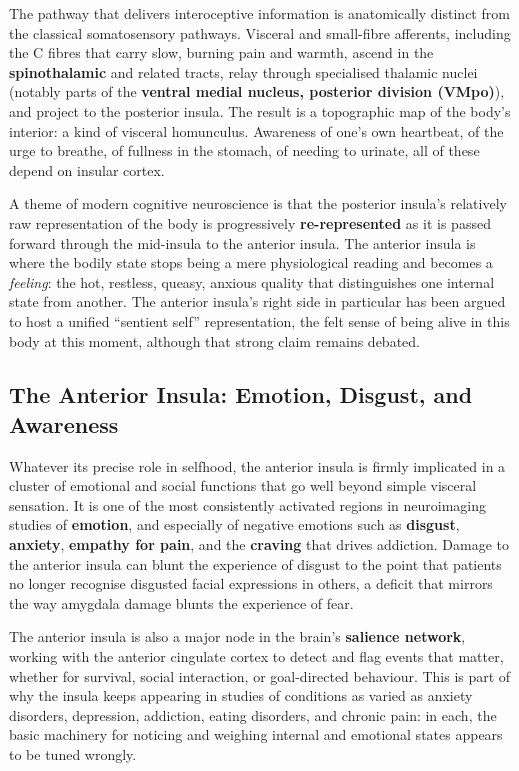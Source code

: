 \documentclass[11pt]{article}
\begin{document}
The pathway that delivers interoceptive information is anatomically distinct from the classical somatosensory pathways. Visceral and small-fibre afferents, including the C fibres that carry slow, burning pain and warmth, ascend in the \textbf{spinothalamic} and related tracts, relay through specialised thalamic nuclei (notably parts of the \textbf{ventral medial nucleus, posterior division (VMpo)}), and project to the posterior insula. The result is a topographic map of the body's interior: a kind of visceral homunculus. Awareness of one's own heartbeat, of the urge to breathe, of fullness in the stomach, of needing to urinate, all of these depend on insular cortex.

A theme of modern cognitive neuroscience is that the posterior insula's relatively raw representation of the body is progressively \textbf{re-represented} as it is passed forward through the mid-insula to the anterior insula. The anterior insula is where the bodily state stops being a mere physiological reading and becomes a \textit{feeling}: the hot, restless, queasy, anxious quality that distinguishes one internal state from another. The anterior insula's right side in particular has been argued to host a unified ``sentient self'' representation, the felt sense of being alive in this body at this moment, although that strong claim remains debated.

\subsection{The Anterior Insula: Emotion, Disgust, and Awareness}

Whatever its precise role in selfhood, the anterior insula is firmly implicated in a cluster of emotional and social functions that go well beyond simple visceral sensation. It is one of the most consistently activated regions in neuroimaging studies of \textbf{emotion}, and especially of negative emotions such as \textbf{disgust}, \textbf{anxiety}, \textbf{empathy for pain}, and the \textbf{craving} that drives addiction. Damage to the anterior insula can blunt the experience of disgust to the point that patients no longer recognise disgusted facial expressions in others, a deficit that mirrors the way amygdala damage blunts the experience of fear.

The anterior insula is also a major node in the brain's \textbf{salience network}, working with the anterior cingulate cortex to detect and flag events that matter, whether for survival, social interaction, or goal-directed behaviour. This is part of why the insula keeps appearing in studies of conditions as varied as anxiety disorders, depression, addiction, eating disorders, and chronic pain: in each, the basic machinery for noticing and weighing internal and emotional states appears to be tuned wrongly.
\end{document}

